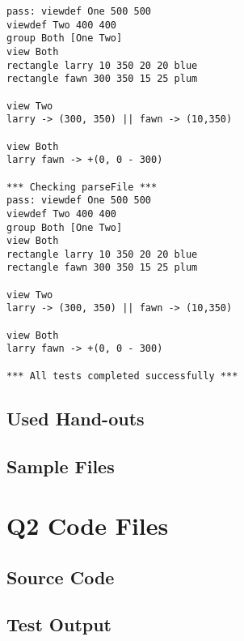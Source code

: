 \documentclass[
paper=a4,
oneside,
fontsize=11pt,
numbers=noenddot,
headinclude=false, %
footinclude=false, %
fleqn,             %
DIV=8
]{scrartcl}
\begin{document}
\begin{lstlisting}[caption=Session output: {\tt src/salsa/SalsaParserTest}, label=lst:testoutparser]
pass: viewdef One 500 500
viewdef Two 400 400
group Both [One Two]
view Both
rectangle larry 10 350 20 20 blue
rectangle fawn 300 350 15 25 plum

view Two
larry -> (300, 350) || fawn -> (10,350)

view Both
larry fawn -> +(0, 0 - 300)

*** Checking parseFile ***
pass: viewdef One 500 500
viewdef Two 400 400
group Both [One Two]
view Both
rectangle larry 10 350 20 20 blue
rectangle fawn 300 350 15 25 plum

view Two
larry -> (300, 350) || fawn -> (10,350)

view Both
larry fawn -> +(0, 0 - 300)

*** All tests completed successfully ***
\end{lstlisting}


\subsection{Used Hand-outs}
\label{sec:hand-outs-used}


\subsection{Sample Files}
\label{sec:sample-files}




\clearpage
\section{Q2 Code Files}
\label{sec:question-2-code}

\subsection{Source Code}
\label{sec:source-2-code}


\subsection{Test Output}
\label{sec:test-2-output}
\end{document}
